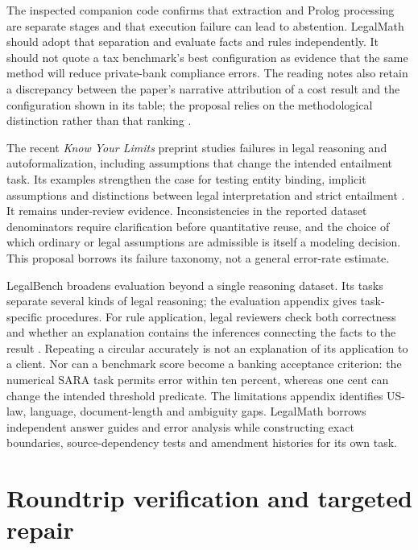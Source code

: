 \documentclass[12pt,a4paper,oneside,openany]{book}
\begin{document}
The inspected companion code confirms that extraction and Prolog processing are
separate stages and that execution failure can lead to abstention. LegalMath
should adopt that separation and evaluate facts and rules independently. It
should not quote a tax benchmark's best configuration as evidence that the same
method will reduce private-bank compliance errors. The reading notes also retain
a discrepancy between the paper's narrative attribution of a cost result and
the configuration shown in its table; the proposal relies on the methodological
distinction rather than that ranking \citep{libraryreview}.

The recent \emph{Know Your Limits} preprint studies failures in legal reasoning
and autoformalization, including assumptions that change the intended entailment
task. Its examples strengthen the case for testing entity binding, implicit
assumptions and distinctions between legal interpretation and strict entailment
\citep[secs.~3--5]{limits2026}. It remains under-review evidence. Inconsistencies
in the reported dataset denominators require clarification before quantitative
reuse, and the choice of which ordinary or legal assumptions are admissible is
itself a modeling decision. This proposal borrows its failure taxonomy, not a
general error-rate estimate.

LegalBench broadens evaluation beyond a single reasoning dataset. Its tasks
separate several kinds of legal reasoning; the evaluation appendix gives
task-specific procedures. For rule application, legal reviewers check both
correctness and whether an explanation contains the inferences connecting the
facts to the result \citep[sec.~3 and evaluation appendix]{legalbench2023}.
Repeating a circular accurately is not an explanation of its application to a
client. Nor can a benchmark score become a banking acceptance criterion: the
numerical SARA task permits error within ten percent, whereas one cent can change
the intended threshold predicate. The limitations appendix identifies US-law,
language, document-length and ambiguity gaps. LegalMath borrows independent
answer guides and error analysis while constructing exact boundaries,
source-dependency tests and amendment histories for its own task.

\section{Roundtrip verification and targeted repair}
\label{merge:M04:11}
\end{document}
